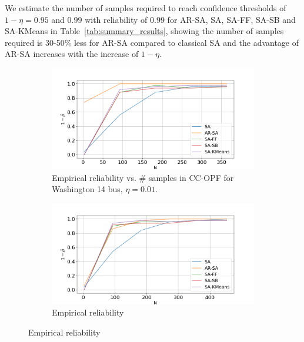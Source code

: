 We estimate the number of samples required to reach confidence thresholds of $1-\eta = 0.95$ and $0.99$ with reliability of $0.99$ for AR-SA, SA, SA-FF, SA-SB and SA-KMeans in Table~\ref{tab:summary_results}, showing the number of samples required is 30-50\% less for AR-SA compared to classical SA and the advantage of AR-SA increases with the increase of $1-\eta$.
\begin{figure}[hbt]
\begin{subfigure}{.50\textwidth}
  \centering
  \hspace{-0mm}\includegraphics[width=0.95\linewidth]{Dissertation/images/dynamic/washington14/1_beta_N_363_eta_0.01.png}
  \caption{Empirical reliability %
  vs. $\#$ samples in CC-OPF for Washington 14 bus, $\eta = 0.01$.}
  \label{fig:washington14conservatism}
\end{subfigure}
\begin{subfigure}{.50\textwidth}
  \centering
  \hspace{-0mm}\includegraphics[width=0.95\linewidth]{Dissertation/images/dynamic/ieee30/1_beta_N_453_eta_0.01.png}
  \caption{Empirical reliability %
}
\end{subfigure}
\end{figure}
